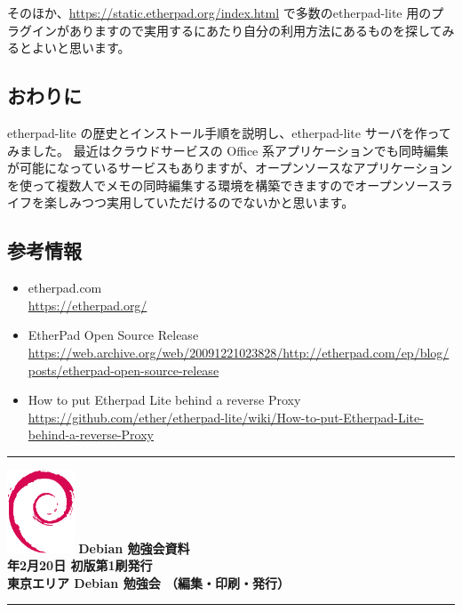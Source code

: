 \documentclass[mingoth,a4paper]{jsarticle}
\newcommand{\debmtgyear}{2021}
\newcommand{\debmtgmonth}{2}
\newcommand{\debmtgdate}{20}
\begin{document}
そのほか、\url{https://static.etherpad.org/index.html} で多数のetherpad-lite 用のプラグインがありますので実用するにあたり自分の利用方法にあるものを探してみるとよいと思います。

\subsection{おわりに}

etherpad-lite の歴史とインストール手順を説明し、etherpad-lite サーバを作ってみました。
最近はクラウドサービスの Office 系アプリケーションでも同時編集が可能になっているサービスもありますが、オープンソースなアプリケーションを使って複数人でメモの同時編集する環境を構築できますのでオープンソースライフを楽しみつつ実用していただけるのでないかと思います。


\subsection{参考情報}

\begin{itemize}
\item etherpad.com \\ \url{https://etherpad.org/}
\item EtherPad Open Source Release \\ \url{https://web.archive.org/web/20091221023828/http://etherpad.com/ep/blog/posts/etherpad-open-source-release}
\item How to put Etherpad Lite behind a reverse Proxy \\ \url{https://github.com/ether/etherpad-lite/wiki/How-to-put-Etherpad-Lite-behind-a-reverse-Proxy}
\end{itemize}


\mbox{}\newpage
\mbox{}\newpage

\vspace*{15cm}
\hrule
\vspace{2mm}
\includegraphics[width=2cm]{image-assets/openlogo-nd.eps}
\noindent \Large \bf Debian 勉強会資料\\
\noindent \normalfont \debmtgyear{}年\debmtgmonth{}月\debmtgdate{}日 \hspace{5mm}  初版第1刷発行\\
\noindent \normalfont 東京エリア Debian 勉強会 （編集・印刷・発行）\\
\hrule
\end{document}
